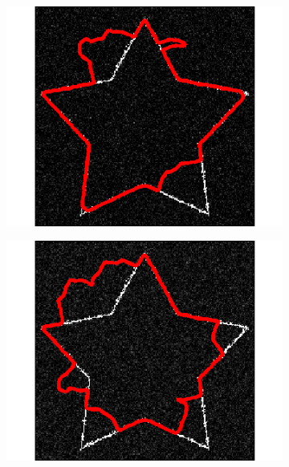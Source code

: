 \begin{figure}[H]
\centering
\begin{subfigure}[c]{0.3\linewidth}
\centering
\includegraphics[width=\textwidth]{Chapters/Images/Noise/gvfg1}
\caption{}
\end{subfigure}
\begin{subfigure}[c]{0.3\linewidth}
\centering
\includegraphics[width=\textwidth]{Chapters/Images/Noise/gvfg5}
\caption{}
\end{subfigure}
\begin{subfigure}[c]{0.3\linewidth}
\centering

\end{subfigure}
\end{figure}
